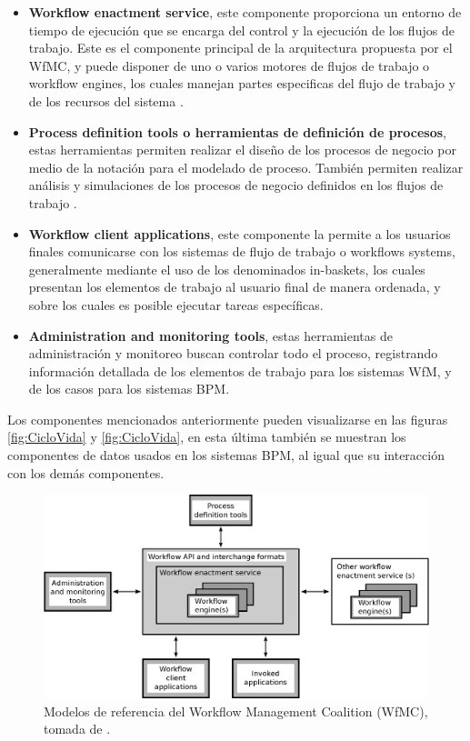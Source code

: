 \begin{itemize}
    \item \textbf{Workflow enactment service}, este componente proporciona un entorno de tiempo de ejecución que se encarga del control y la ejecución de los flujos de trabajo. Este es el componente principal de la arquitectura propuesta por el WfMC,  y puede disponer de uno o varios motores de flujos de trabajo o workflow engines, los cuales manejan partes especificas del flujo de trabajo y de los recursos del sistema \cite{VanderAalst2013}. 
    
    \item \textbf{Process definition tools o herramientas de definición de procesos}, estas herramientas permiten realizar el diseño de los procesos de negocio por medio de la notación para el modelado de proceso. También permiten realizar análisis y simulaciones de los procesos de negocio definidos en los flujos de trabajo \cite{VanderAalst2013}. 
    
    \item \textbf{Workflow client applications}, este componente la permite a los usuarios finales comunicarse con los sistemas de flujo de trabajo o workflows systems, generalmente mediante el uso de los denominados in-baskets, los cuales presentan los elementos de trabajo al usuario final de manera ordenada, y sobre los cuales es posible ejecutar tareas específicas.
    
    \item \textbf{Administration and monitoring tools}, estas herramientas de administración y monitoreo buscan controlar todo el proceso, registrando información detallada de los elementos de trabajo para los sistemas WfM, y de los casos para los sistemas BPM.
    
\end{itemize}

Los componentes mencionados anteriormente pueden visualizarse en las figuras \ref{fig:CicloVida} y \ref{fig:CicloVida}, en esta última también se muestran los componentes de datos usados en los sistemas BPM, al igual que su interacción con los demás componentes.

\begin{figure}[htbp!] 
    \centering    
    \includegraphics[width=1.0\textwidth]{Chapter1/Figs/Vector/Figure_referenceWfMC.eps}
    \caption[Modelos de referencia del Workflow Management Coalition (WfMC)]{Modelos de referencia del Workflow Management Coalition (WfMC), tomada de \cite[Fig.~15]{VanderAalst2004}.}
    \label{fig:ReferenceWfMC}
\end{figure}

